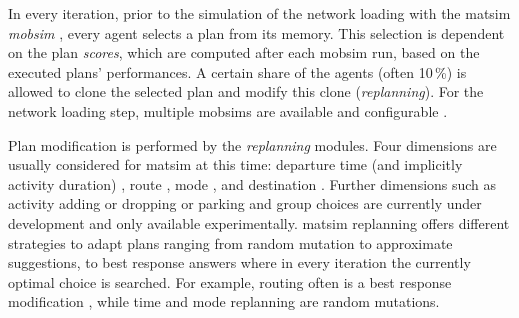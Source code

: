In every iteration, prior to the simulation of the network loading with the \gls{matsim} \emph{\gls{mobsim}} \citep[e.g.,][]{Cetin_PhDThesis_2005}, every agent selects a plan from its memory. This selection is dependent on the plan \emph{scores}, which are computed after each mobsim run, based on the executed plans' performances. A certain share of the agents 
(often 10\,\%) is allowed to clone the selected plan and modify this clone (\emph{\gls{replanning}}).
For the network loading 
step, multiple \glspl{mobsim} are available and configurable \citep[][p.10f]{HorniEtAl_TechRep_IVT_2011_a, MATSim_Userguide_2015}. 

Plan modification is performed by the \emph{replanning} modules. Four dimensions are usually considered for \gls{matsim} at this time: departure time (and implicitly activity duration) \citep[][]{BalmerRaneyEtAl2005act-times}, route \citep[]{LefebvreBalmer_STRC_2007}, mode \citep{GretherEtAl2009SimpleModeChoiceIPL}, and destination \citep{HorniEtc2008locachoice,HorniEtAl2011TrbLocationChoice}. Further dimensions such as activity adding or dropping or parking and group choices are currently under development and only available experimentally. %
\gls{matsim} replanning offers different strategies to adapt plans ranging from random mutation to approximate suggestions, to best response answers where in every iteration the currently optimal choice is searched. For example, routing
often is a best response modification%
, while time and mode replanning are random mutations.

